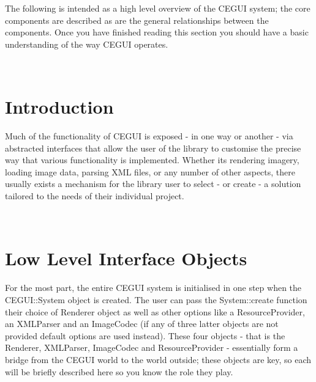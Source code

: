 The following is intended as a high level overview of the C\+E\+G\+UI system; the core components are described as are the general relationships between the components. Once you have finished reading this section you should have a basic understanding of the way C\+E\+G\+UI operates.

~\newline
 \hypertarget{arch_overview_arch_overview_intro}{}\section{Introduction}\label{arch_overview_arch_overview_intro}
Much of the functionality of C\+E\+G\+UI is exposed -\/ in one way or another -\/ via abstracted interfaces that allow the user of the library to customise the precise way that various functionality is implemented. Whether it\textquotesingle{}s rendering imagery, loading image data, parsing X\+ML files, or any number of other aspects, there usually exists a mechanism for the library user to select -\/ or create -\/ a solution tailored to the needs of their individual project.

~\newline
 \hypertarget{arch_overview_arch_overview_lowlevel}{}\section{Low Level Interface Objects}\label{arch_overview_arch_overview_lowlevel}
For the most part, the entire C\+E\+G\+UI system is initialised in one step when the C\+E\+G\+U\+I\+::\+System object is created. The user can pass the System\+::create function their choice of Renderer object as well as other options like a Resource\+Provider, an X\+M\+L\+Parser and an Image\+Codec (if any of three latter objects are not provided default options are used instead). These four objects -\/ that is the Renderer, X\+M\+L\+Parser, Image\+Codec and Resource\+Provider -\/ essentially form a bridge from the C\+E\+G\+UI world to the world outside; these objects are key, so each will be briefly described here so you know the role they play.

